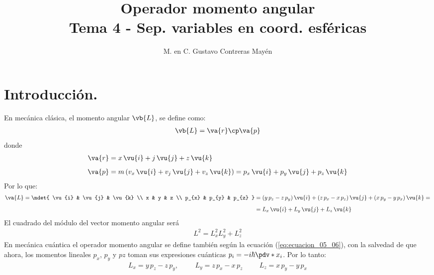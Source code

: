 
\usepackage{apacite}
\title{Operador momento angular \\ \large {Tema 4 - Sep. variables en coord. esféricas} \vspace{-3ex}}
\author{M. en C. Gustavo Contreras Mayén}
\date{ }

\vspace{-4cm}
\maketitle
\fontsize{14}{14}\selectfont
\tableofcontents
\newpage
\section{Introducción.}
En mecánica clásica, el momento angular $\vb{L}$, se define como:
\begin{align}
\vb{L} = \va{r} \cp \va{p}
\label{eq:ecuacion_05_05}
\end{align}
donde
\begin{align*}
\va{r} &= x \, \vu{i} + j \, \vu{j} + z \, \vu{k} \\[0.5em]
\va{p} &= m \left( v_{x} \, \vu{i} + v_{j} \, \vu{j} + v_{z} \, \vu{k} \right) = p_{x} \, \vu{i} + p_{y} \, \vu{j} + p_{z} \, \vu{k}
\end{align*}
Por lo que:
\begin{align}
\begin{aligned}
\va{L} = \mdet{
\vu{i} & \vu{j} & \vu{k} \\
x & y & z \\
p_{x} & p_{y} & p_{z}
} &= ( y \, p_{z} - z \, p_{y}) \, \vu{i} + ( z \, p_{x} - x \, p_{z}) \, \vu{j} + ( x \, p_{y} - y \, p_{x}) \, \vu{k} = \\[0.5em]
&= L_{x} \, \vu{i} + L_{y} \, \vu{j} + L_{z} \, \vu{k}
\end{aligned}
\label{eq:ecuacion_05_06}
\end{align}
El cuadrado del módulo del vector momento angular será
\begin{align}
L^{2} = L_{x}^{2} L_{y}^{2} + L_{z}^{2}
\label{eq:ecuacion_05_07}
\end{align}
En mecánica cuántica el operador momento angular se define también según la ecuación (\ref{eq:ecuacion_05_06}), con la salvedad de que ahora, los momentos lineales $p_{x}$, $p_{y}$ y $p{z}$ toman sus expresiones cuánticas  $p_{i} = -i \hbar \pdv*{x_{i}}$. Por lo tanto: 
\begin{align}
L_{x} = y \, p_{z} - z \, p_{y}, \hspace{1cm} L_{y} = z \, p_{x} - x \, p_{z} \hspace{1cm} L_{z} = x \, p_{y} - y \, p_{x} 
\end{align}
